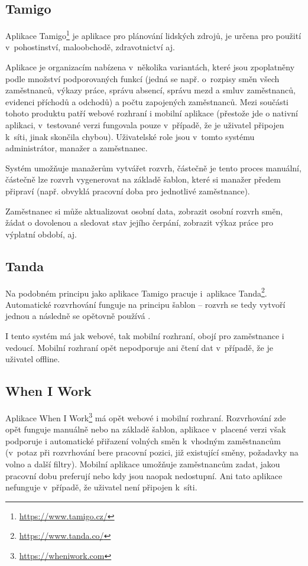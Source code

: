 \documentclass[a4paper,11pt,openany,twoside]{book}
\begin{document}
\subsection{Tamigo}
Aplikace Tamigo\footnote{\url{https://www.tamigo.cz/}} je aplikace pro plánování lidských zdrojů, je určena pro použití v~pohostinství, maloobchodě, zdravotnictví aj. \cite{tamigo2020reseni}

Aplikace je organizacím nabízena v~několika variantách, které jsou zpop\-lat\-ně\-ny podle množství podporovaných funkcí (jedná se např. o~rozpisy směn všech zaměstnanců, výkazy práce, správu absencí, správu mezd a smluv zaměstnanců, evidenci příchodů a odchodů) a počtu zapojených zaměstnanců. Mezi součásti tohoto produktu patří webové rozhraní i mobilní aplikace (přestože jde o nativní aplikaci, v~testované verzi fungovala pouze v~případě, že je uživatel připojen k~síti, jinak skončila chybou). Uživatelské role jsou v~tomto systému administrátor, manažer a zaměstnanec.

Systém umožňuje manažerům vytvářet rozvrh, částečně je tento proces manuální, částečně lze rozvrh vygenerovat na základě šablon, které si manažer předem připraví (např. obvyklá pracovní doba pro jednotlivé zaměstnance).

Za\-měst\-na\-nec si může aktualizovat osobní data, zobrazit osobní rozvrh směn, žádat o dovolenou a sledovat stav jejího čerpání, zobrazit výkaz práce pro výplatní období, aj.

\subsection{Tanda}
Na podobném principu jako aplikace Tamigo pracuje i~aplikace Tanda\footnote{\url{https://www.tanda.co/}}. Automatické rozvrhování funguje na principu šablon -- rozvrh se tedy vytvoří jednou a následně se opětovně používá \cite{tanda2020rosters}.

I tento systém má jak webové, tak mobilní rozhraní, obojí pro zaměstnance i vedoucí. Mobilní rozhraní opět nepodporuje ani čtení dat v~případě, že je uživatel offline.

\subsection{When I Work}
Aplikace When I Work\footnote{\url{https://wheniwork.com}} má opět webové i mobilní rozhraní. Rozvrhování zde opět funguje manuálně nebo na základě šablon, aplikace v~placené verzi \cite{wheinwork2020pricing} však podporuje i automatické přiřazení volných směn k~vhodným zaměstnancům (v~potaz při rozvrhování bere pracovní pozici, již existující směny, požadavky na volno a další filtry). \cite{wheinwork2020employee} Mobilní aplikace umožňuje zaměstnancům zadat, jakou pracovní dobu preferují nebo kdy jsou naopak nedostupní. Ani tato aplikace nefunguje v~případě, že uživatel není připojen k~síti.
\end{document}
